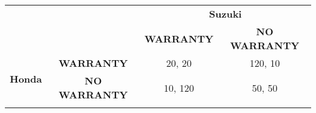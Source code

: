 \documentclass{standalone}
\begin{document}
\begin{tabular}{rccc}
& & \multicolumn{2}{c}{\textbf{Suzuki}} \\
& & \textbf{WARRANTY} & \textbf{NO WARRANTY} \\ 
\cline{3-4}
\multirow{2}{*}{\textbf{Honda}}& \textbf{WARRANTY} & \multicolumn{1}{|c|}{20, 20} & \multicolumn{1}{c|}{120, 10} \\ 
\cline{3-4}
& \textbf{NO WARRANTY} & \multicolumn{1}{|c|}{10, 120} & \multicolumn{1}{c|}{50, 50} \\ 
\cline{3-4}\\
\end{tabular}
\end{document}

